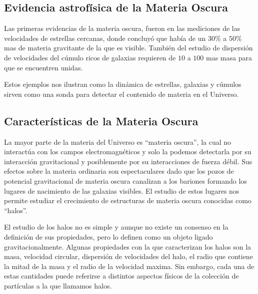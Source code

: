 \documentclass{beamer}
\begin{document}

\subsection{Evidencia astrofísica de la Materia Oscura}
	\begin{frame}
		Las primeras evidencias de la materia oscura, fueron en las mediciones de las velocidades de estrellas cercanas, donde concluyó que había de un $30\%$ a $50\%$ mas de materia gravitante de la que es visible. También del estudio de dispersión de velocidades del cúmulo ricos de galaxias requieren de $10$ a $100$ mas masa para que se encuentren unidas. 
		
		Estos ejemplos nos ilustran como la dinámica de estrellas, galaxias y cúmulos sirven como una sonda para detectar el contenido de materia en el Universo.


	\end{frame}
\subsection{Características de la Materia Oscura}

	\begin{frame}
			La mayor parte de la materia del Universo es ``materia oscura'', la cual no interactúa con los campos electromagnéticos y solo la podemos detectarla por su interacción gravitacional y posiblemente por su interacciones de fuerza débil. Sus efectos sobre la materia ordinaria son espectaculares dado que los pozos de potencial gravitacional de materia oscura canalizan a los bariones formando los lugares de nacimiento de las galaxias visibles. El estudio de estos lugares nos permite estudiar el crecimiento de estructuras de materia oscura conocidas como ``halos''.

	\end{frame}


	\begin{frame}
		El estudio de los halos no es simple y aunque no existe un consenso en la definición de sus propiedades, pero lo definen como un objeto ligado gravitacionalmente. Algunas propiedades con la que caracterizan los halos son la masa, velocidad circular, dispersión de velocidades del halo, el radio que contiene la mitad de la masa y el radio  de la velocidad maxima. Sin embargo, cada una de estas cantidades puede referirse a distintos aspectos físicos de la colección de partículas a la que llamamos halos.
	\end{frame}
\end{document}
